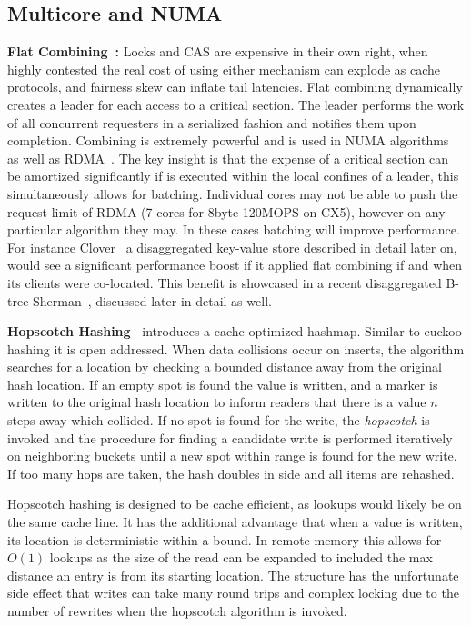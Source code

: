\subsection{Multicore and NUMA}

\textbf{Flat Combining~\cite{flat-combine}:} Locks and CAS are expensive in
their own right, when highly contested the real cost of using either mechanism
can explode as cache protocols, and fairness skew can inflate tail latencies.
Flat combining dynamically creates a leader for each access to a critical
section.  The leader performs the work of all concurrent requesters in a
serialized fashion and notifies them upon completion. Combining is extremely
powerful and is used in NUMA algorithms~\cite{black-box-numa} as well as
RDMA~\cite{flock}. The key insight is that the expense of a critical section can
be amortized significantly if is executed within the local confines of a leader,
this simultaneously allows for batching. Individual cores may not be able to
push the request limit of RDMA (7 cores for 8byte 120MOPS on CX5), however on
any particular algorithm they may. In these cases batching will improve
performance. For instance Clover~\cite{clover} a disaggregated key-value store
described in detail later on, would see a significant performance boost if it
applied flat combining if and when its clients were co-located. This benefit is
showcased in a recent disaggregated B-tree Sherman~\cite{sherman}, discussed
later in detail as well.

\textbf{Hopscotch Hashing~\cite{hopscotch}} introduces a cache optimized
hashmap. Similar to cuckoo hashing it is open addressed. When data collisions
occur on inserts, the algorithm searches for a location by checking a
bounded distance away from the original hash location. If an empty spot is found the
value is written, and a marker is written to the original hash location to
inform readers that there is a value $n$ steps away which collided. If no spot
is found for the write, the \textit{hopscotch} is invoked and the procedure for
finding a candidate write is performed iteratively on neighboring buckets until
a new spot within range is found for the new write. If too many hops are taken,
the hash doubles in side and all items are rehashed.

Hopscotch hashing is designed to be cache efficient, as lookups would likely be
on the same cache line. It has the additional advantage that when a value is
written, its location is deterministic within a bound. In remote memory this
allows for $O(1)$ lookups as the size of the read can be expanded to included
the max distance an entry is from its starting location. The structure has the 
unfortunate side effect that writes can take many round trips and complex
locking due to the number of rewrites when the hopscotch algorithm is invoked.



